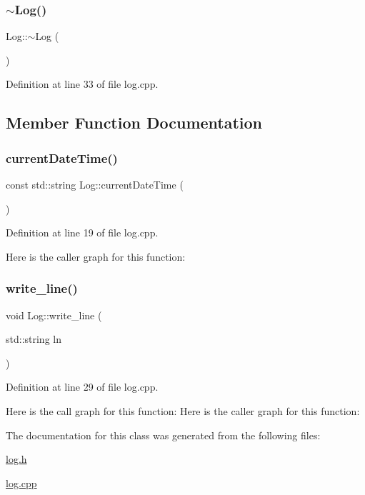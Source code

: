 \subsubsection{\texorpdfstring{$\sim$\+Log()}{~Log()}}
{\footnotesize\ttfamily Log\+::$\sim$\+Log (\begin{DoxyParamCaption}{ }\end{DoxyParamCaption})}



Definition at line 33 of file log.\+cpp.



\subsection{Member Function Documentation}
\mbox{\label{class_log_af056ba4ff9151d69bf1b302a95253c52}} 
\subsubsection{\texorpdfstring{current\+Date\+Time()}{currentDateTime()}}
{\footnotesize\ttfamily const std\+::string Log\+::current\+Date\+Time (\begin{DoxyParamCaption}{ }\end{DoxyParamCaption})}



Definition at line 19 of file log.\+cpp.

Here is the caller graph for this function\+:
\mbox{\label{class_log_aeb1d174708785f8f763895ad8e41d580}} 
\subsubsection{\texorpdfstring{write\+\_\+line()}{write\_line()}}
{\footnotesize\ttfamily void Log\+::write\+\_\+line (\begin{DoxyParamCaption}\item[{std\+::string}]{ln }\end{DoxyParamCaption})}



Definition at line 29 of file log.\+cpp.

Here is the call graph for this function\+:
Here is the caller graph for this function\+:


The documentation for this class was generated from the following files\+:\begin{DoxyCompactItemize}
\item 
\mbox{\hyperlink{log_8h}{log.\+h}}\item 
\mbox{\hyperlink{log_8cpp}{log.\+cpp}}\end{DoxyCompactItemize}
